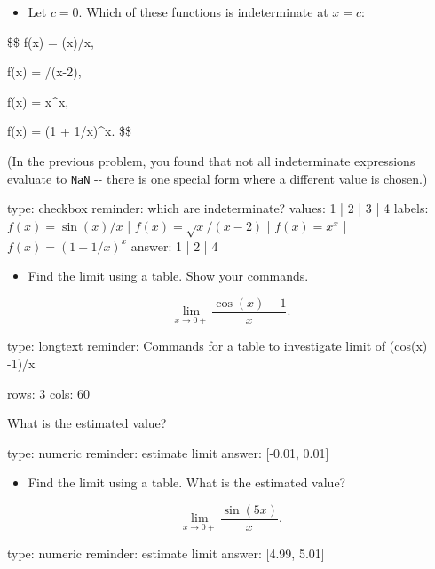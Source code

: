 \documentclass[12pt]{article}
\begin{document}
\begin{itemize}
\itemsep1pt\parskip0pt
\item
  Let $c=0$. Which of these functions is indeterminate at $x=c$:
\end{itemize}

\$\$ f(x) = \sin(x)/x, \quad

f(x) = /(x-2), \quad

f(x) = x\^{}x, \quad

f(x) = (1 + 1/x)\^{}x. \$\$

(In the previous problem, you found that not all indeterminate
expressions evaluate to \texttt{NaN} -{}- there is one special form
where a different value is chosen.)

\begin{answer}
type: checkbox
reminder: which are indeterminate?
values: 1 | 2 | 3 | 4
labels: \( f(x) = \sin(x)/x \) | \( f(x) = \sqrt{x}/(x-2) \) | \( f(x) = x^x \) | \( f(x) = (1 + 1/x)^x \)
answer: 1 | 2 | 4
\end{answer}

\begin{itemize}
\itemsep1pt\parskip0pt
\item
  Find the limit using a table. Show your commands.
\end{itemize}

\[
\lim_{x \rightarrow 0+} \frac{\cos(x) - 1}{x}.
\]

\begin{answer}
type: longtext
reminder: Commands for a table to investigate limit of (cos(x) -1)/x

rows: 3
cols: 60
\end{answer}

What is the estimated value?

\begin{answer}
    type: numeric
    reminder: estimate limit
    answer: [-0.01, 0.01]

\end{answer}

\begin{itemize}
\itemsep1pt\parskip0pt
\item
  Find the limit using a table. What is the estimated value?
\end{itemize}

\[
\lim_{x \rightarrow 0+} \frac{\sin(5x)}{x}.
\]

\begin{answer}
    type: numeric
    reminder: estimate limit
    answer: [4.99, 5.01]

\end{answer}
\end{document}

